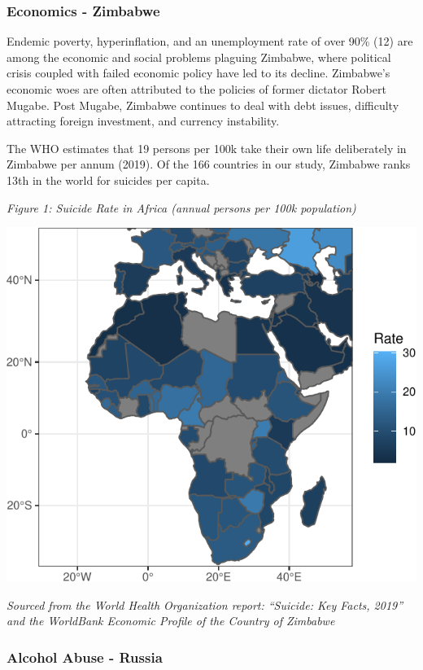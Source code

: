 \documentclass[]{article}
\begin{document}
\subsubsection{Economics - Zimbabwe}\label{economics---zimbabwe}

Endemic poverty, hyperinflation, and an unemployment rate of over 90\%
(12) are among the economic and social problems plaguing Zimbabwe, where
political crisis coupled with failed economic policy have led to its
decline. Zimbabwe's economic woes are often attributed to the policies
of former dictator Robert Mugabe. Post Mugabe, Zimbabwe continues to
deal with debt issues, difficulty attracting foreign investment, and
currency instability.

The WHO estimates that 19 persons per 100k take their own life
deliberately in Zimbabwe per annum (2019). Of the 166 countries in our
study, Zimbabwe ranks 13th in the world for suicides per capita.

\emph{Figure 1: Suicide Rate in Africa (annual persons per 100k
population)}

\begin{center}\includegraphics{Project_Report_files/figure-latex/africa_map_plot-1} \end{center}

\emph{Sourced from the World Health Organization report: ``Suicide: Key
Facts, 2019'' and the WorldBank Economic Profile of the Country of
Zimbabwe}

\subsubsection{Alcohol Abuse - Russia}\label{alcohol-abuse---russia}
\end{document}
